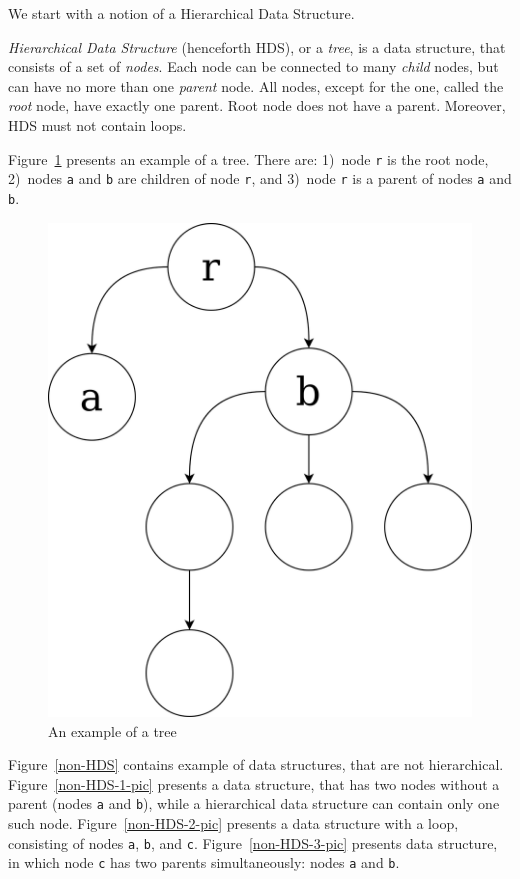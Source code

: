 \documentclass[times, dvipsnames,%
               languages={russian,english} %
              ]{itmo-student-thesis}
\begin{document}
We start with a notion of a Hierarchical Data Structure.

\bigbreak
\begin{definition}
\emph{Hierarchical Data Structure} (henceforth HDS), or a \emph{tree}, is a data structure, that consists of a set of \emph{nodes}. Each node can be connected to many \emph{child} nodes, but can have no more than one \emph{parent} node. All nodes, except for the one, called the \emph{root} node, have exactly one parent. Root node does not have a parent. Moreover, HDS must not contain loops.
\end{definition}
\bigbreak

Figure~\ref{HDS-pic} presents an example of a tree. There are: 1)~node \texttt{r} is the root node, 2)~nodes \texttt{a} and \texttt{b} are children of node \texttt{r}, and 3)~node \texttt{r} is a parent of nodes \texttt{a} and \texttt{b}.

\begin{figure}[H]
  \centering
  \caption{An example of a tree}
  \label{HDS-pic}
  \includegraphics[width=0.5\linewidth]{HDS.png}
\end{figure}

Figure~\ref{non-HDS} contains example of data structures, that are not hierarchical. Figure~\ref{non-HDS-1-pic} presents a data structure, that has two nodes without a parent (nodes \texttt{a} and \texttt{b}), while a hierarchical data structure can contain only one such node. Figure~\ref{non-HDS-2-pic} presents a data structure with a loop, consisting of nodes \texttt{a}, \texttt{b}, and \texttt{c}. Figure~\ref{non-HDS-3-pic} presents data structure, in which node \texttt{c} has two parents simultaneously: nodes \texttt{a} and \texttt{b}.
\end{document}
